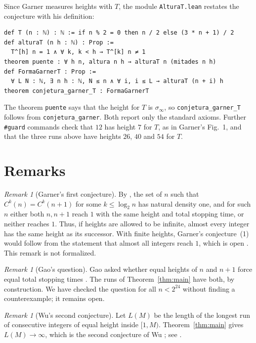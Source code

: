 \documentclass[11pt]{amsart}
\theoremstyle{definition}
\theoremstyle{remark}
\newtheorem{remark}[theorem]{Remark}
\newcommand{\lean}[1]{\nolinkurl{#1}}
\begin{document}
Since Garner measures heights with $T$, the module \lean{AlturaT.lean} restates the conjecture with his definition:

\begin{Verbatim}[fontsize=\small]
def T (n : ℕ) : ℕ := if n % 2 = 0 then n / 2 else (3 * n + 1) / 2
def alturaT (n h : ℕ) : Prop :=
  T^[h] n = 1 ∧ ∀ k, k < h → T^[k] n ≠ 1
theorem puente : ∀ h n, altura n h → alturaT n (mitades n h)
def FormaGarnerT : Prop :=
  ∀ L N : ℕ, ∃ n h : ℕ, N ≤ n ∧ ∀ i, i ≤ L → alturaT (n + i) h
theorem conjetura_garner_T : FormaGarnerT
\end{Verbatim}

\noindent The theorem \lean{puente} says that the height for $T$ is $\sigma_\infty$, so \lean{conjetura_garner_T} follows from \lean{conjetura_garner}. Both report only the standard axioms. Further \texttt{\#guard} commands check that $12$ has height $7$ for $T$, as in Garner's Fig.~1, and that the three runs above have heights $26$, $40$ and $54$ for $T$.

\section{Remarks}\label{sec:remarks}

\begin{remark}[Garner's first conjecture]\label{rem:garner1}
By \cite{SaidGao}, the set of $n$ such that $C^{k}(n)=C^{k}(n+1)$ for some $k\le\log_2 n$ has natural density one, and for such $n$ either both $n,n+1$ reach $1$ with the same height and total stopping time, or neither reaches $1$. Thus, if heights are allowed to be infinite, almost every integer has the same height as its successor. With finite heights, Garner's conjecture~(1) would follow from the statement that almost all integers reach $1$, which is open \cite{KL03,SaidWu}. This remark is not formalized.
\end{remark}

\begin{remark}[Gao's question]
Gao asked whether equal heights of $n$ and $n+1$ force equal total stopping times \cite[p.~266]{Gao93}. The runs of Theorem~\ref{thm:main} have both, by construction. We have checked the question for all $n<2^{24}$ without finding a counterexample; it remains open.
\end{remark}

\begin{remark}[Wu's second conjecture]
Let $L(M)$ be the length of the longest run of consecutive integers of equal height inside $[1,M)$. Theorem~\ref{thm:main} gives $L(M)\to\infty$, which is the second conjecture of Wu \cite{Wu92}; see \cite{SaidWu}.
\end{remark}
\end{document}
